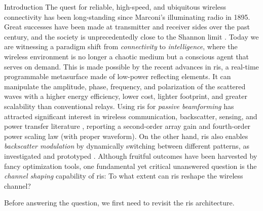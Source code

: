 \documentclass[journal]{IEEEtran}
\begin{document}
\glsresetall

\begin{section}{Introduction}
	The quest for reliable, high-speed, and ubiquitous wireless connectivity has been long-standing since Marconi's illuminating radio in 1895.
	Great successes have been made at transmitter and receiver sides over the past century, and the society is unprecedentedly close to the Shannon limit \cite{Shannon1948}.
	Today we are witnessing a paradigm shift from \emph{connectivity} to \emph{intelligence}, where the wireless environment is no longer a chaotic medium but a conscious agent that serves on demand.
	This is made possible by the recent advances in \gls{ris}, a real-time programmable metasurface made of low-power reflecting elements.
	It can manipulate the amplitude, phase, frequency, and polarization of the scattered waves \cite{Basar2019} with a higher energy efficiency, lower cost, lighter footprint, and greater scalability than conventional relays.
	Using \gls{ris} for \emph{passive beamforming} has attracted significant interest in wireless communication, backscatter, sensing, and power transfer literature \cite{Wu2019,Wu2020c,Yang2020,Zheng2021,Jia2020,Liang2022,Liu2022a,Hua2023,Wu2021d,Feng2022,Zhao2022}, reporting a second-order array gain and fourth-order power scaling law (with proper waveform).
	On the other hand, \gls{ris} also enables \emph{backscatter modulation} by dynamically switching between different patterns, as investigated \cite{Liu2019d,Karasik2020,Basar2020,Ma2020a,Zhang2021d,Hua2022,Zhao2022a} and prototyped \cite{Tang2019a,Dai2020a}.
	Although fruitful outcomes have been harvested by fancy optimization tools, one fundamental yet critical unanswered question is the \emph{channel shaping} capability of \gls{ris}: To what extent can \gls{ris} reshape the wireless channel?

	Before answering the question, we first need to revisit the \gls{ris} architecture.


\end{section}
\end{document}
